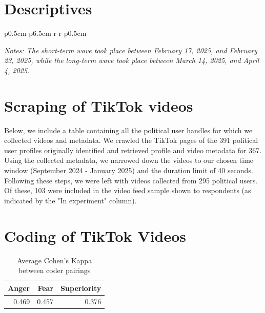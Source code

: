 \documentclass[12pt]{article}
\begin{document}
\section{Descriptives}
\begin{table}[h]
    \caption{Descriptives on videos and video behavior \label{tab:descriptives}}
    \centering
    {\footnotesize {}
    \begin{tabular}{p{0.5cm} p{6.5cm} r r p{0.5cm}}
    \hline
         \\
    \hline
    \end{tabular}
    }

    \vspace{0.3cm}
    \parbox{0.9\linewidth}{\footnotesize \textit{Notes: The short-term wave took place between February 17, 2025, and February 23, 2025, while the long-term wave took place between March 14, 2025, and April 4, 2025.}}
\end{table}


\clearpage
\section{Scraping of TikTok videos}\label{tiktok:users_list}
Below, we include a table containing all the political user handles for which we collected videos and metadata. We crawled the TikTok pages of the 391 political user profiles originally identified and retrieved profile and video metadata for 367. Using the collected metadata, we narrowed down the videos to our chosen time window (September 2024 - January 2025) and the duration limit of 40 seconds. Following these steps, we were left with videos collected from 295 political users. Of these, 103 were included in the video feed sample shown to respondents (as indicated by the "In experiment" column). 






\clearpage
\section{Coding of TikTok Videos}
\label{videos}

\begin{table}[ht]
    \centering
\begin{tabular}{|r|r|r|}
\hline
\textbf{Anger} & \textbf{Fear} & \textbf{Superiority} \\
\hline
0.469 & 0.457 & 0.376 \\
\hline
\end{tabular}
    \caption{Average Cohen's Kappa between coder pairings}
    \label{tab:cohens_kappa}
\end{table}
\end{document}
